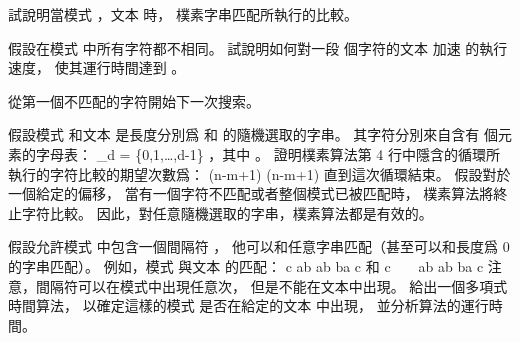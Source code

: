 \startsection[
  title={The naive string-matching algorithm},
]

\startEXERCISE
試說明當模式 ，文本  時，
樸素字串匹配所執行的比較。
\stopEXERCISE

\startANSWER
{}
\stopANSWER

\startEXERCISE
假設在模式  中所有字符都不相同。
試說明如何對一段  個字符的文本  加速
  的執行速度，
使其運行時間達到 。
\stopEXERCISE

\startANSWER
從第一個不匹配的字符開始下一次搜索。
\stopANSWER

\startEXERCISE
假設模式  和文本  是長度分別爲  和  的隨機選取的字串。
其字符分別來自含有  個元素的字母表：
\startformula
\sum_d = \{0,1,\ldots,d-1\}
\stopformula
，其中 。
證明樸素算法第 4 行中隱含的循環所執行的字符比較的{\EMP 期望}次數爲：
\startformula
(n-m+1)  (n-m+1)
\stopformula
直到這次循環結束。
假設對於一個給定的偏移，
當有一個字符不匹配或者整個模式已被匹配時，
樸素算法將終止字符比較。
因此，對任意隨機選取的字串，樸素算法都是有效的。
\stopEXERCISE

\startANSWER
{}
\stopANSWER

\startEXERCISE[exercise:32.1-4]
假設允許模式  中包含一個{\EMP 間隔符} \m{\diamondsuit}，
他可以和{\EMP 任意}字串匹配（甚至可以和長度爲 0 的字串匹配）。
例如，模式  與文本  的匹配：
\startformula\startmathalignment[n=7,
  align={middle,middle,middle,middle,middle,middle,middle}]
\NC c \NC {} \NC {} \NC {}
  \NC {} \NC {} \NC ab \NR
\NC   \NC ab \NC \diamondsuit \NC ba \NC \diamondsuit \NC c \NR
\stopmathalignment\stopformula
和
\startformula\startmathalignment[n=7,
  align={middle,middle,middle,middle,middle,middle,middle}]
\NC c \NC {} \NC {} \NC {}
  \NC \ \underbrace{\ } \  \NC {} \NC ab \NR
\NC   \NC ab \NC \diamondsuit \NC ba \NC \diamondsuit \NC c \NR
\stopmathalignment\stopformula
注意，間隔符可以在模式中出現任意次，
但是不能在文本中出現。
給出一個多項式時間算法，
以確定這樣的模式  是否在給定的文本  中出現，
並分析算法的運行時間。
\stopEXERCISE

\startANSWER
{}
\stopANSWER

\stopsection
